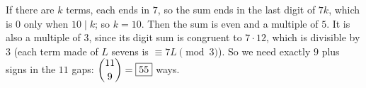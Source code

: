 If there are $k$ terms, each ends in $7$, so the sum ends in the last digit of $7k$, which is $0$ only when $10\mid k$; so $k=10$. Then the sum is even and a multiple of $5$. It is also a multiple of $3$, since its digit sum is congruent to $7\cdot12$, which is divisible by $3$ (each term made of $L$ sevens is $\equiv7L\pmod3$). So we need exactly $9$ plus signs in the $11$ gaps: $\dbinom{11}{9}=\boxed{55}$ ways.
